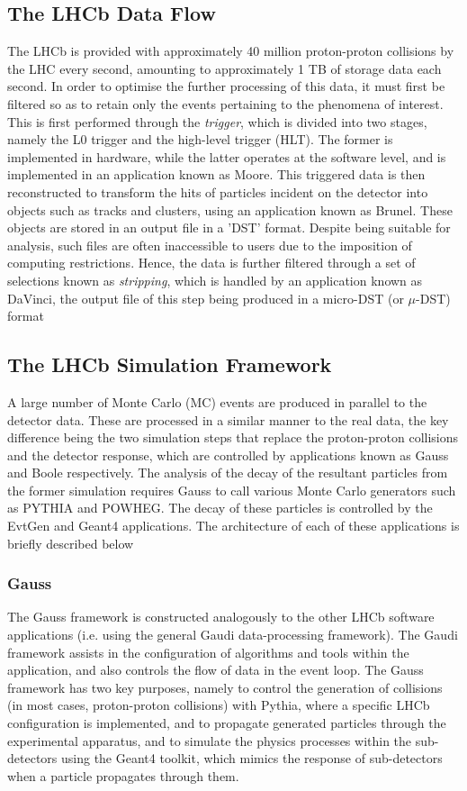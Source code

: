 \subsection{The LHCb Data Flow}
The LHCb is provided with approximately 40 million proton-proton collisions by the LHC every second, amounting to approximately 1 TB of storage data each second. In order to optimise the further processing of this data, it must first be filtered so as to retain
only the events pertaining to the phenomena of interest. This is first performed through the \textit{trigger}, which is divided into two stages, namely the L0 trigger and the high-level trigger (HLT). The former is implemented in hardware, while the latter operates at
the software level, and is implemented in an application known as Moore. This triggered data is then reconstructed to transform the hits of particles incident on the detector into objects such as tracks and clusters, using an application known as Brunel. These objects are stored in an
output file in a 'DST' format. Despite being suitable for analysis, such files are often inaccessible to users due to the imposition of computing restrictions. Hence, the data is further filtered through a set of selections known as \textit{stripping}, which is handled by an application known as 
DaVinci, the output file of this step being produced in a micro-DST (or $\mu$-DST) format
\subsection{The LHCb Simulation Framework}
A large number of Monte Carlo (MC) events are produced in parallel to the detector data. These are processed in a similar manner to the real data, the key difference being the two simulation steps that replace the proton-proton collisions and the detector response, which are controlled by
applications known as Gauss and Boole respectively. The analysis of the decay of the resultant particles from the former simulation requires Gauss to call various Monte Carlo generators such as PYTHIA and POWHEG. The decay of these particles is controlled by the EvtGen and Geant4 applications. The architecture of each of these applications is briefly described
below
\subsubsection{Gauss}
The Gauss framework is constructed analogously to the other LHCb software applications (i.e. using the general Gaudi data-processing framework). The Gaudi framework assists in the configuration
of algorithms and tools within the application, and also controls the flow of data in the event loop. The Gauss framework has two key purposes, namely to control the generation of collisions (in most cases,
proton-proton collisions) with Pythia, where a specific LHCb configuration is implemented, and to propagate generated particles through the experimental apparatus, and to simulate the physics processes within the sub-detectors using 
the Geant4 toolkit, which mimics the response of sub-detectors when a particle propagates through them.
